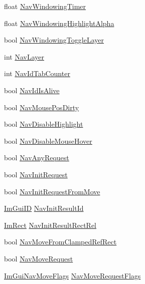 \begin{DoxyCompactItemize}
\item 
float \mbox{\hyperlink{struct_im_gui_context_a412d61294f8c686db6ecc366c845bd08}{Nav\+Windowing\+Timer}}
\item 
float \mbox{\hyperlink{struct_im_gui_context_a58906b21765f83b753e33b4733fa596c}{Nav\+Windowing\+Highlight\+Alpha}}
\item 
bool \mbox{\hyperlink{struct_im_gui_context_a324b59dc38e7121a1aef959218d3563a}{Nav\+Windowing\+Toggle\+Layer}}
\item 
int \mbox{\hyperlink{struct_im_gui_context_ae048414959d95b70f63f9a067803956f}{Nav\+Layer}}
\item 
int \mbox{\hyperlink{struct_im_gui_context_a2a0858cb7aa0b8de0346e93b7f9d2cee}{Nav\+Id\+Tab\+Counter}}
\item 
bool \mbox{\hyperlink{struct_im_gui_context_aabd1e23f5be55f6331281f2c2ea9e411}{Nav\+Id\+Is\+Alive}}
\item 
bool \mbox{\hyperlink{struct_im_gui_context_a45d87c28d8ea54ea82cb5d26c12c13db}{Nav\+Mouse\+Pos\+Dirty}}
\item 
bool \mbox{\hyperlink{struct_im_gui_context_a15bae5126d0c9f911ff5eacda9e6958f}{Nav\+Disable\+Highlight}}
\item 
bool \mbox{\hyperlink{struct_im_gui_context_aee7132fe5dfc3afdecf13c319da7dbf6}{Nav\+Disable\+Mouse\+Hover}}
\item 
bool \mbox{\hyperlink{struct_im_gui_context_a2bb94ad4b29cd6359f5e2a6d0f24e617}{Nav\+Any\+Request}}
\item 
bool \mbox{\hyperlink{struct_im_gui_context_ac1e37ea3392df255f52f8cc53bf8180a}{Nav\+Init\+Request}}
\item 
bool \mbox{\hyperlink{struct_im_gui_context_a92dbda9104ae60cea64926e9e7d98702}{Nav\+Init\+Request\+From\+Move}}
\item 
\mbox{\hyperlink{imgui_8h_a1785c9b6f4e16406764a85f32582236f}{Im\+Gui\+ID}} \mbox{\hyperlink{struct_im_gui_context_a1a4e4062115647df8cfc566e595fe3e1}{Nav\+Init\+Result\+Id}}
\item 
\mbox{\hyperlink{struct_im_rect}{Im\+Rect}} \mbox{\hyperlink{struct_im_gui_context_a4d59fe60fd93303628212a3d52f6c9e0}{Nav\+Init\+Result\+Rect\+Rel}}
\item 
bool \mbox{\hyperlink{struct_im_gui_context_a5571249e733688870409369db98fde79}{Nav\+Move\+From\+Clamped\+Ref\+Rect}}
\item 
bool \mbox{\hyperlink{struct_im_gui_context_ab476c1e9c5fca5e45ca80001a5fd532e}{Nav\+Move\+Request}}
\item 
\mbox{\hyperlink{imgui__internal_8h_aff7a453b89555bb074f2fe46a159ac25}{Im\+Gui\+Nav\+Move\+Flags}} \mbox{\hyperlink{struct_im_gui_context_a04545cc7ba343f69391ea61b8dc62df2}{Nav\+Move\+Request\+Flags}}

\end{DoxyCompactItemize}
